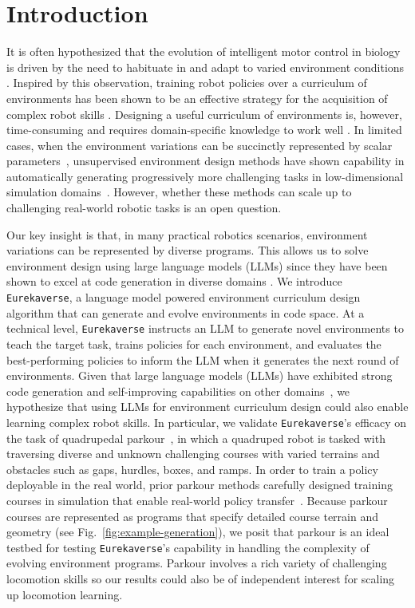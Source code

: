 \documentclass{article}
\newcommand{\ourmethod}{\texttt{Eurekaverse}\xspace}
\begin{document}
\section{Introduction}
It is often hypothesized that the evolution of intelligent motor control in biology is driven by the need to habituate in and adapt to varied environment conditions
\citep{floreano2008evolutionary, gupta2021embodied}. Inspired by this observation, training robot policies over a curriculum of environments has been shown to be an effective strategy for the acquisition of complex robot skills \citep{bansal2018emergent, baker2020emergent, tang2021learning, tidd2021guided, Marzari_2022}. Designing a useful curriculum of environments is, however, time-consuming and requires domain-specific knowledge to work well \citep{duan2022learning}. In limited cases, when the environment variations can be succinctly represented by scalar parameters~\citep{dennis2020emergent,jiang2021replay}, unsupervised environment design methods have shown capability in automatically generating progressively more challenging tasks in low-dimensional simulation domains~\citep{dennis2020emergent,jiang2021prioritized,wang2019paired}. However, whether these methods can scale up to challenging real-world robotic tasks is an open question. 

Our key insight is that, in many practical robotics scenarios, environment variations can be represented by diverse programs. This allows us to solve environment design using large language models (LLMs) since they have been shown to excel at code generation in diverse domains \citep{rozière2024code, Li_2022, nijkamp2023codegen, badagabettu2024query2cad}. We introduce \ourmethod, a language model powered environment curriculum design algorithm that can generate and evolve environments in code space. At a technical level, \ourmethod instructs an LLM to generate novel environments to teach the target task, trains policies for each environment, and evaluates the best-performing policies to inform the LLM when it generates the next round of environments. Given that large language models (LLMs) have exhibited strong code generation and self-improving capabilities on other domains~\citep{patel2024large, chen2024selfplay, huang2022large}, we hypothesize that using LLMs for environment curriculum design could also enable learning complex robot skills. In particular, we validate \ourmethod's efficacy on the task of quadrupedal parkour~\citep{zhuang2023robot, cheng2023extreme}, in which a quadruped robot is tasked with traversing diverse and unknown challenging courses with varied terrains and obstacles such as gaps, hurdles, boxes, and ramps. In order to train a policy deployable in the real world, prior parkour methods carefully designed training courses in simulation that enable real-world policy transfer~\citep{cheng2023extreme,zhuang2023robot}. Because parkour courses are represented as programs that specify detailed course terrain and geometry (see Fig.~\ref{fig:example-generation}), we posit that parkour is an ideal testbed for testing \ourmethod's capability in handling the complexity of evolving environment programs. Parkour involves a rich variety of challenging locomotion skills  so our results could also be of independent interest for scaling up locomotion learning. 
\end{document}
